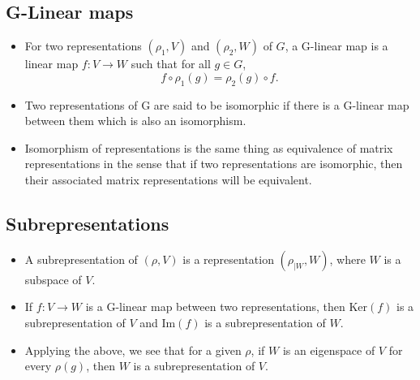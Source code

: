 \documentclass[a4paper]{article}
\begin{document}
\subsection{G-Linear maps}
\begin{itemize}
    \item For two representations $(\rho_1, V)$ and $(\rho_2, W)$ of $G$, a G-linear map is a linear map $f: V \to W$ such that for all $g \in G$, $$f \circ \rho_1(g) = \rho_2(g) \circ f.$$
    \item Two representations of G are said to be isomorphic if there is a G-linear map between them which is also an isomorphism.
    \item Isomorphism of representations is the same thing as equivalence of matrix representations in the sense that if two representations are isomorphic, then their associated matrix representations will be equivalent.
\end{itemize}

\subsection{Subrepresentations}
\begin{itemize}
    \item A subrepresentation of $(\rho, V)$ is a representation $(\rho_{|W}, W)$, where $W$ is a subspace of $V$.
    \item If $f: V \to W$ is a G-linear map between two representations, then Ker$(f)$ is a subrepresentation of $V$ and Im$(f)$ is a subrepresentation of $W$. 
    \item Applying the above, we see that for a given $\rho$, if $W$ is an eigenspace of $V$ for every $\rho(g)$, then $W$ is a subrepresentation of $V$.
\end{itemize}
\end{document}
